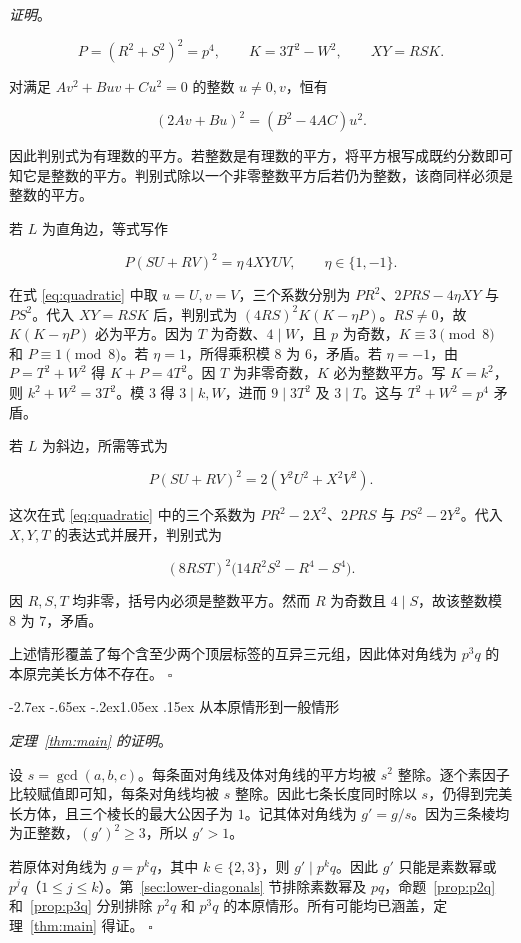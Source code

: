 \documentclass[11pt,a4paper,twoside]{article}
\makeatletter
\numberwithin{equation}{section}
\newcommand{\proofof}{定理~\ref{thm:main} 的证明}
\newcommand{\proseheadingstop}{。}
\providecommand{\proofname}{证明}
\renewcommand{\section}{\@startsection{section}{1}{\z@}%
  {-2.7ex \@plus -.65ex \@minus -.2ex}{1.05ex \@plus .15ex}%
  {\normalfont\large\bfseries}}
\newenvironment{proof}[1][\proofname]{%
  \par\addvspace{.65\baselineskip}\noindent
  \textit{#1}\proseheadingstop\enspace\ignorespaces
}{%
  \unskip\nobreak\hfill\nobreak\(\square\)\par
  \addvspace{.65\baselineskip}
}
\makeatother
\begin{document}
\begin{proof}
\[
P=(R^2+S^2)^2=p^4,\qquad K=3T^2-W^2,\qquad XY=RSK.
\]

对满足 \(Av^2+Buv+Cu^2=0\) 的整数 \(u\ne0,v\)，恒有

\begin{equation}\label{eq:quadratic}
(2Av+Bu)^2=(B^2-4AC)u^2.
\end{equation}

因此判别式为有理数的平方。若整数是有理数的平方，将平方根写成既约分数即可知它是整数的平方。判别式除以一个非零整数平方后若仍为整数，该商同样必须是整数的平方。

若 \(L\) 为直角边，等式写作

\[
P(SU+RV)^2=\eta\,4XYUV,\qquad \eta\in\{1,-1\}.
\]

在式 \eqref{eq:quadratic} 中取 \(u=U,v=V\)，三个系数分别为 \(PR^2\)、\(2PRS-4\eta XY\) 与 \(PS^2\)。代入 \(XY=RSK\) 后，判别式为 \((4RS)^2K(K-\eta P)\)。\(RS\ne0\)，故 \(K(K-\eta P)\) 必为平方。因为 \(T\) 为奇数、\(4\mid W\)，且 \(p\) 为奇数，\(K\equiv3\pmod8\) 和 \(P\equiv1\pmod8\)。若 \(\eta=1\)，所得乘积模 \(8\) 为 \(6\)，矛盾。若 \(\eta=-1\)，由 \(P=T^2+W^2\) 得 \(K+P=4T^2\)。因 \(T\) 为非零奇数，\(K\) 必为整数平方。写 \(K=k^2\)，则 \(k^2+W^2=3T^2\)。模 \(3\) 得 \(3\mid k,W\)，进而 \(9\mid3T^2\) 及 \(3\mid T\)。这与 \(T^2+W^2=p^4\) 矛盾。

若 \(L\) 为斜边，所需等式为

\[
P(SU+RV)^2=2(Y^2U^2+X^2V^2).
\]

这次在式 \eqref{eq:quadratic} 中的三个系数为 \(PR^2-2X^2\)、\(2PRS\) 与 \(PS^2-2Y^2\)。代入 \(X,Y,T\) 的表达式并展开，判别式为

\[
(8RST)^2\bigl(14R^2S^2-R^4-S^4\bigr).
\]

因 \(R,S,T\) 均非零，括号内必须是整数平方。然而 \(R\) 为奇数且 \(4\mid S\)，故该整数模 \(8\) 为 \(7\)，矛盾。

上述情形覆盖了每个含至少两个顶层标签的互异三元组，因此体对角线为 \(p^3q\) 的本原完美长方体不存在。
\end{proof}

\section{从本原情形到一般情形}
\label{sec:general}

\begin{proof}[\proofof]
设 \(s=\gcd(a,b,c)\)。每条面对角线及体对角线的平方均被 \(s^2\) 整除。逐个素因子比较赋值即可知，每条对角线均被 \(s\) 整除。因此七条长度同时除以 \(s\)，仍得到完美长方体，且三个棱长的最大公因子为 \(1\)。记其体对角线为 \(g'=g/s\)。因为三条棱均为正整数，\((g')^2\ge3\)，所以 \(g'>1\)。

若原体对角线为 \(g=p^kq\)，其中 \(k\in\{2,3\}\)，则 \(g'\mid p^kq\)。因此 \(g'\) 只能是素数幂或 \(p^jq\)（\(1\le j\le k\)）。第~\ref{sec:lower-diagonals} 节排除素数幂及 \(pq\)，命题~\ref{prop:p2q} 和~\ref{prop:p3q} 分别排除 \(p^2q\) 和 \(p^3q\) 的本原情形。所有可能均已涵盖，定理~\ref{thm:main} 得证。
\end{proof}
\end{document}
